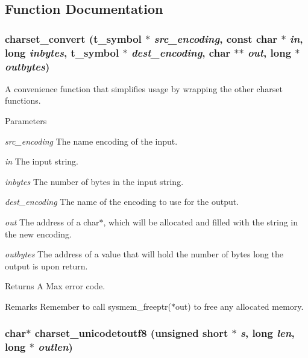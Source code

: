 \subsection{Function Documentation}
\hypertarget{group__unicode_ga9ec526f1940a33256f61e5d5fdf8283c}{
\subsubsection[{charset\_\-convert}]{ charset\_\-convert ({\bf t\_\-symbol} $\ast$ {\em src\_\-encoding}, \/  const char $\ast$ {\em in}, \/  long {\em inbytes}, \/  {\bf t\_\-symbol} $\ast$ {\em dest\_\-encoding}, \/  char $\ast$$\ast$ {\em out}, \/  long $\ast$ {\em outbytes})}}
\label{group__unicode_ga9ec526f1940a33256f61e5d5fdf8283c}


A convenience function that simplifies usage by wrapping the other charset functions. 
\begin{DoxyParams}{Parameters}
\item[{\em src\_\-encoding}]The name encoding of the input. \item[{\em in}]The input string. \item[{\em inbytes}]The number of bytes in the input string. \item[{\em dest\_\-encoding}]The name of the encoding to use for the output. \item[{\em out}]The address of a char$\ast$, which will be allocated and filled with the string in the new encoding. \item[{\em outbytes}]The address of a value that will hold the number of bytes long the output is upon return. \end{DoxyParams}
\begin{DoxyReturn}{Returns}
A Max error code. 
\end{DoxyReturn}
\begin{DoxyRemark}{Remarks}
Remember to call sysmem\_\-freeptr($\ast$out) to free any allocated memory. 
\end{DoxyRemark}
\hypertarget{group__unicode_gad14b26e9b1d77ef47170076d0d9e099c}{
\subsubsection[{charset\_\-unicodetoutf8}]{\setlength{\rightskip}{0pt plus 5cm}char$\ast$ charset\_\-unicodetoutf8 (unsigned short $\ast$ {\em s}, \/  long {\em len}, \/  long $\ast$ {\em outlen})}}
\label{group__unicode_gad14b26e9b1d77ef47170076d0d9e099c}


